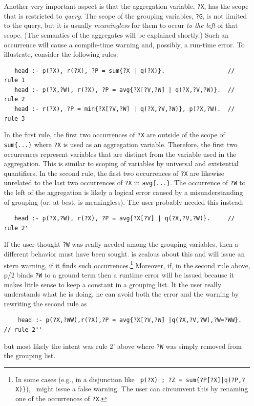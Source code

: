 \documentclass[11pt]{article}
\newcommand{\ERGO}{\mbox{\smaller{\ensuremath{\cal{E}}\smaller{{\sc{RGO}}}}}\xspace}
\newcommand{\FLSYSTEM}{\ERGO}
\begin{document}
Another very important aspect is that 
the aggregation variable, \texttt{?X}, 
has the scope that is restricted to \emph{query}.
The scope of the grouping variables, \texttt{?G}, is not limited to the query,
but it is usually \emph{meaningless} for them to occur \emph{to
  the left} of that scope. (The semantics of the aggregates will be
explained shortly.)
Such an occurrence will cause a compile-time warning and, possibly, a
run-time error.
To illustrate, consider the following rules:
\begin{verbatim}
   head :- p(?X), r(?X), ?P = sum{?X | q(?X)}.                  // rule 1
   head :- p(?X,?W), r(?X), ?P = avg{?X[?V,?W] | q(?X,?V,?W)}.  // rule 2
   head :- r(?X), ?P = min{?X[?V,?W] | q(?X,?V,?W)}, p(?X,?W).  // rule 3
\end{verbatim}
In the first rule,
the first two occurrences of \texttt{?X}
are outside of the
scope of \texttt{sum\{...\}}  where \texttt{?X} is used as an aggregation
variable. Therefore, the first two occurrences represent
variables that are distinct from
the variable used in the aggregation. This is similar to
scoping of variables by universal and existential quantifiers. 
In the second rule, the first two occurrences of \texttt{?X} are likewise
unrelated to the last two
occurrences of \texttt{?X} in \texttt{avg\{...\}}.
The occurrence of \texttt{?W} to the left of the aggregation is likely a logical
error caused by a misunderstanding of grouping
(or, at best, is meaningless). The user probably needed
this instead:
\begin{verbatim}
   head :- p(?X,?W), r(?X), ?P = avg{?X[?V] | q(?X,?V,?W)}.     // rule 2'
\end{verbatim}
If the user thought \texttt{?W} was really needed among the grouping variables,
then a different behavior must have been sought.
\FLSYSTEM is zealous about this and will issue an stern warning, if it
finds such occurrences.\footnote{
  In some cases (e.g., in a disjunction like~
  \texttt{p(?X) ; ?Z = sum\{?P[?X]|q(?P,?X)\}}),~
  \FLSYSTEM might issue a false warning. The user can
  circumvent this by renaming one of the occurrences of \texttt{?X}. 
}
Moreover, if, in the second rule above, p/2 binds \texttt{?W} to a ground term
then a runtime error will be issued because it makes little sense to
keep a constant in a grouping list. It the user really understands what he
is doing, he can avoid both the error and the warning by rewriting the
second rule as
\begin{verbatim}
    head :- p(?X,?WW),r(?X),?P = avg{?X[?V,?W] |q(?X,?V,?W),?W=?WW}. // rule 2''
\end{verbatim}
but most likely the intent was rule 2' above where \texttt{?W} was simply
removed from the grouping list. 
\end{document}
